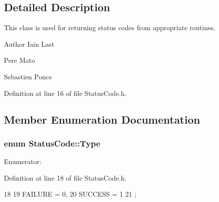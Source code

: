 \subsection{Detailed Description}
This class is used for returning status codes from appropriate routines.

\begin{DoxyAuthor}{Author}
Iain Last 

Pere Mato 

Sebastien Ponce 
\end{DoxyAuthor}


Definition at line 16 of file StatusCode.h.

\subsection{Member Enumeration Documentation}
\hypertarget{classStatusCode_a6f565cbeadc76d14c72f047e5e85eb4b}{
\subsubsection[{Type}]{\setlength{\rightskip}{0pt plus 5cm}enum {\bf StatusCode::Type}}}
\label{classStatusCode_a6f565cbeadc76d14c72f047e5e85eb4b}
\begin{Desc}
\item[Enumerator: ]\par
\begin{description}
\item[{\em 
\hypertarget{classStatusCode_a6f565cbeadc76d14c72f047e5e85eb4ba3da73d4c469762eb9d3c960368252b26}{
FAILURE}
\label{classStatusCode_a6f565cbeadc76d14c72f047e5e85eb4ba3da73d4c469762eb9d3c960368252b26}
}]\item[{\em 
\hypertarget{classStatusCode_a6f565cbeadc76d14c72f047e5e85eb4badd0da38d3ba0d922efd1f4619bc37ad8}{
SUCCESS}
\label{classStatusCode_a6f565cbeadc76d14c72f047e5e85eb4badd0da38d3ba0d922efd1f4619bc37ad8}
}]\end{description}
\end{Desc}



Definition at line 18 of file StatusCode.h.


\begin{DoxyCode}
18             {
19     FAILURE = 0,
20     SUCCESS = 1
21   };
\end{DoxyCode}



